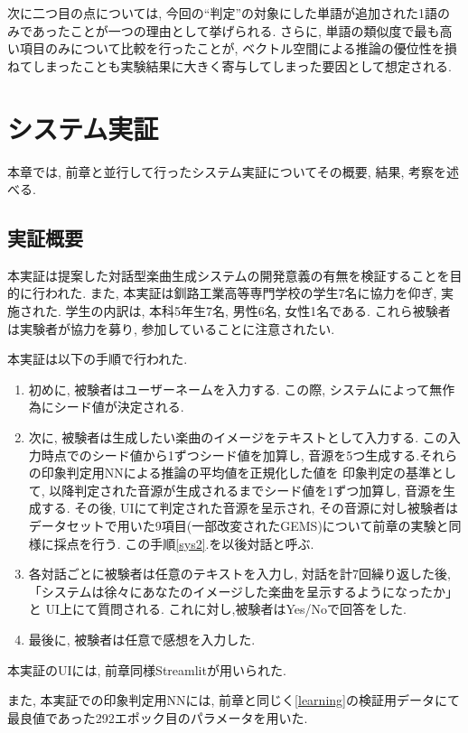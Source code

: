 \documentclass[a4paper,11pt,dvipdfmx]{jreport}
\begin{document}
次に二つ目の点については, 今回の``判定''の対象にした単語が追加された1語のみであったことが一つの理由として挙げられる.
さらに, 単語の類似度で最も高い項目のみについて比較を行ったことが, ベクトル空間による推論の優位性を損ねてしまったことも実験結果に大きく寄与してしまった要因として想定される.

\newpage
\chapter{システム実証}
本章では, 前章と並行して行ったシステム実証についてその概要, 結果, 考察を述べる.
\section{実証概要}
本実証は提案した対話型楽曲生成システムの開発意義の有無を検証することを目的に行われた.
また, 本実証は釧路工業高等専門学校の学生7名に協力を仰ぎ, 実施された.
学生の内訳は, 本科5年生7名, 男性6名, 女性1名である.
これら被験者は実験者が協力を募り, 参加していることに注意されたい.

本実証は以下の手順で行われた.
\begin{enumerate}
  \item 初めに, 被験者はユーザーネームを入力する.
        この際, システムによって無作為にシード値が決定される.
  \item 次に, 被験者は生成したい楽曲のイメージをテキストとして入力する.
        この入力時点でのシード値から1ずつシード値を加算し,
        音源を5つ生成する.それらの印象判定用NNによる推論の平均値を正規化した値を
        印象判定の基準として, 以降判定された音源が生成されるまでシード値を1ずつ加算し, 
        音源を生成する. その後, UIにて判定された音源を呈示され, その音源に対し被験者は
        データセットで用いた9項目(一部改変されたGEMS)について前章の実験と同様に採点を行う.
        この手順\ref{sys2}.を以後対話と呼ぶ.
        \label{sys2}
  \item 各対話ごとに被験者は任意のテキストを入力し, 対話を計7回繰り返した後, 
        「システムは徐々にあなたのイメージした楽曲を呈示するようになったか」と
        UI上にて質問される.
        これに対し,被験者はYes/Noで回答をした.
  \item 最後に, 被験者は任意で感想を入力した.
\end{enumerate}

本実証のUIには, 前章同様Streamlitが用いられた.

また, 本実証での印象判定用NNには, 前章と同じく\ref{learning}の検証用データにて最良値であった292エポック目のパラメータを用いた.
\end{document}
